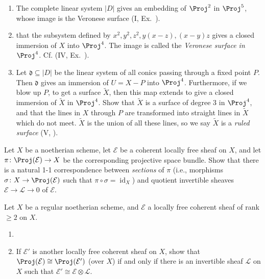 {{\begin{description}[style=multiline,labelwidth=2.6em,leftmargin=2.9em,itemsep=2pt,topsep=0pt,parsep=0pt]
\begin{enumerate}[label=\normalfont(\alph*),leftmargin=1.48em,itemsep=0pt,topsep=0pt,parsep=0pt]
\item The complete linear system $|D|$ gives an embedding of $\Proj^2$ in $\Proj^5$, whose image is the Veronese surface (I, Ex.~).
\item {} that the subsystem defined by $x^2,y^2,z^2,y(x-z),(x-y)z$ gives a closed immersion of $X$ into $\Proj^4$. The image is called the \emph{Veronese surface in $\Proj^4$}. Cf. (IV, Ex.~).
\item Let $\mathfrak d\subseteq|D|$ be the linear system of all conics passing through a fixed point $P$. Then $\mathfrak d$ gives an immersion of $U=X-P$ into $\Proj^4$. Furthermore, if we blow up $P$, to get a surface $\widetilde X$, then this map extends to give a closed immersion of $\widetilde X$ in $\Proj^4$. Show that $\widetilde X$ is a surface of degree $3$ in $\Proj^4$, and that the lines in $X$ through $P$ are transformed into straight lines in $\widetilde X$ which do not meet. $\widetilde X$ is the union of all these lines, so we say $\widetilde X$ is a \emph{ruled surface} (V, ).
\end{enumerate}
\item[\hypertarget{ex-II-7.8}{}7.8.] Let $X$ be a noetherian scheme, let $\mathcal E$ be a coherent locally free sheaf on $X$, and let $\pi\colon\Proj(\mathcal E)\to X$ be the corresponding projective space bundle. Show that there is a natural 1-1 correspondence between \emph{sections} of $\pi$ (i.e., morphisms $\sigma\colon X\to\Proj(\mathcal E)$ such that $\pi\circ\sigma=\operatorname{id}_X$) and quotient invertible sheaves $\mathcal E\to\mathcal L\to 0$ of $\mathcal E$.
\item[\hypertarget{ex-II-7.9}{}7.9.] Let $X$ be a regular noetherian scheme, and $\mathcal E$ a locally free coherent sheaf of rank $\ge 2$ on $X$.
\begin{enumerate}[label=\normalfont(\alph*),leftmargin=1.48em,itemsep=0pt,topsep=0pt,parsep=0pt]
\item {}
\item If $\mathcal E'$ is another locally free coherent sheaf on $X$, show that $\Proj(\mathcal E)\cong\Proj(\mathcal E')$ (over $X$) if and only if there is an invertible sheaf $\mathcal L$ on $X$ such that $\mathcal E'\cong\mathcal E\otimes\mathcal L$.

\end{enumerate}
\end{description}}}
